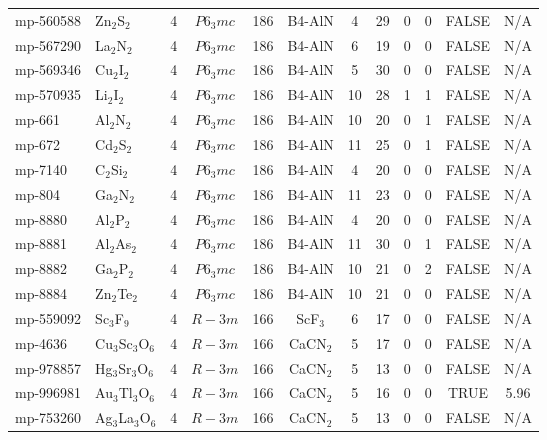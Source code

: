 {\begin{longtable}{llcccccccccc}
    mp-560588 & Zn$_{2}$S$_{2}$ & 4     & $P6_3mc$ & 186   & B4-AlN & 4     & 29    & 0     & 0     & FALSE & N/A \\
    mp-567290 & La$_{2}$N$_{2}$ & 4     & $P6_3mc$ & 186   & B4-AlN & 6     & 19    & 0     & 0     & FALSE & N/A \\
    mp-569346 & Cu$_{2}$I$_{2}$ & 4     & $P6_3mc$ & 186   & B4-AlN & 5     & 30    & 0     & 0     & FALSE & N/A \\
    mp-570935 & Li$_{2}$I$_{2}$ & 4     & $P6_3mc$ & 186   & B4-AlN & 10    & 28    & 1     & 1     & FALSE & N/A \\
    mp-661 & Al$_{2}$N$_{2}$ & 4     & $P6_3mc$ & 186   & B4-AlN & 10    & 20    & 0     & 1     & FALSE & N/A \\
    mp-672 & Cd$_{2}$S$_{2}$ & 4     & $P6_3mc$ & 186   & B4-AlN & 11    & 25    & 0     & 1     & FALSE & N/A \\
    mp-7140 & C$_{2}$Si$_{2}$ & 4     & $P6_3mc$ & 186   & B4-AlN & 4     & 20    & 0     & 0     & FALSE & N/A \\
    mp-804 & Ga$_{2}$N$_{2}$ & 4     & $P6_3mc$ & 186   & B4-AlN & 11    & 23    & 0     & 0     & FALSE & N/A \\
    mp-8880 & Al$_{2}$P$_{2}$ & 4     & $P6_3mc$ & 186   & B4-AlN & 4     & 20    & 0     & 0     & FALSE & N/A \\
    mp-8881 & Al$_{2}$As$_{2}$ & 4     & $P6_3mc$ & 186   & B4-AlN & 11    & 30    & 0     & 1     & FALSE & N/A \\
    mp-8882 & Ga$_{2}$P$_{2}$ & 4     & $P6_3mc$ & 186   & B4-AlN & 10    & 21    & 0     & 2     & FALSE & N/A \\
    mp-8884 & Zn$_{2}$Te$_{2}$ & 4     & $P6_3mc$ & 186   & B4-AlN & 10    & 21    & 0     & 0     & FALSE & N/A \\
    mp-559092 & Sc$_{3}$F$_{9}$ & 4     & $R-3m$ & 166   & ScF$_{3}$ & 6     & 17    & 0     & 0     & FALSE & N/A \\
    mp-4636 & Cu$_{3}$Sc$_{3}$O$_{6}$ & 4     & $R-3m$ & 166   & CaCN$_{2}$ & 5     & 17    & 0     & 0     & FALSE & N/A \\
    mp-978857 & Hg$_{3}$Sr$_{3}$O$_{6}$ & 4     & $R-3m$ & 166   & CaCN$_{2}$ & 5     & 13    & 0     & 0     & FALSE & N/A \\
    mp-996981 & Au$_{3}$Tl$_{3}$O$_{6}$ & 4     & $R-3m$ & 166   & CaCN$_{2}$ & 5     & 16    & 0     & 0     & TRUE  & 5.96  \\
    mp-753260 & Ag$_{3}$La$_{3}$O$_{6}$ & 4     & $R-3m$ & 166   & CaCN$_{2}$ & 5     & 13    & 0     & 0     & FALSE & N/A \\

\end{longtable}}
